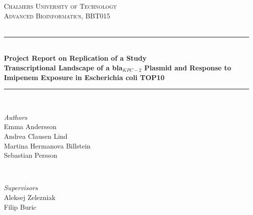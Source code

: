 \documentclass[a4paper]{article}
\begin{document}
\thispagestyle{empty}


\newcommand{\HRule}{\rule{\linewidth}{0.5mm}} %

\begin{center} %
 

\textsc{\LARGE Chalmers University of Technology}\\[1.5cm] %
\textsc{\Large Advanced Bioinformatics, BBT015}\\[0.5cm] %

\textsc{\Large }\\[0.5cm] %

\HRule \\[0.8cm]
{ \huge \bfseries Project Report on Replication of a Study 
 }\\[0.8cm] 
\Large \bfseries Transcriptional Landscape of a bla$_{KPC-2}$ Plasmid and Response to Imipenem Exposure in Escherichia coli TOP10
\HRule \\[0.8cm]


 

\begin{minipage}[t]{0.5\textwidth}
\begin{flushleft} \large
\emph{Authors}\\
\bigskip
Emma Andersson\\
Andrea Clausen Lind\\
Martina Hermanova Billstein\\
Sebastian Persson

\end{flushleft}
\end{minipage}
~
\begin{minipage}[t]{0.4\textwidth}
\begin{flushright} \large
\emph{Supervisors}\\
\bigskip
Aleksej Zelezniak\\
Filip Buric
\end{flushright}
\end{minipage}\\[2cm]


\end{center}
\end{document}
